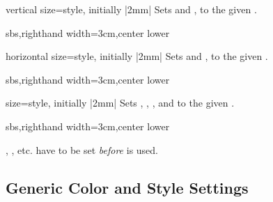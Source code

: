\clearpage

\begin{vigTcbKey}[][doc new=2016-04-22]{vertical size}{=}{style, initially |2mm|}
  Sets  and ,
  to the given .
\begin{dispExample*}{sbs,righthand width=3cm,center lower}
\end{dispExample*}
\end{vigTcbKey}

\begin{vigTcbKey}[][doc new=2016-04-22]{horizontal size}{=}{style, initially |2mm|}
  Sets  and ,
  to the given .
\begin{dispExample*}{sbs,righthand width=3cm,center lower}
\end{dispExample*}
\end{vigTcbKey}


\begin{vigTcbKey}[][doc new=2016-04-22]{size}{=}{style, initially |2mm|}
  Sets , ,
  , and  to the given .
\begin{dispExample*}{sbs,righthand width=3cm,center lower}
\end{dispExample*}
\end{vigTcbKey}


\begin{marker}
, , etc. have to
be set \emph{before}  is used.
\end{marker}



\subsection{Generic Color and Style Settings}\label{subsec:vignettestyle}

